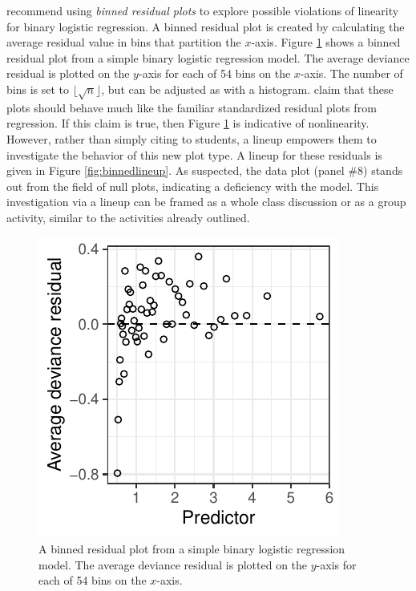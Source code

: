 \documentclass[12pt]{article}
\begin{document}
\citet{GelmanHill:2007} recommend using \emph{binned residual plots} to
explore possible violations of linearity for binary logistic regression.
A binned residual plot is created by calculating the average residual
value in bins that partition the \(x\)-axis. Figure \ref{fig:binned}
shows a binned residual plot from a simple binary logistic regression
model. The average deviance residual is plotted on the \(y\)-axis for
each of 54 bins on the \(x\)-axis. The number of bins is set to
\(\lfloor \sqrt{n} \rfloor\), but can be adjusted as with a histogram.
\citet{GelmanHill:2007} claim that these plots should behave much like
the familiar standardized residual plots from regression. If this claim
is true, then Figure \ref{fig:binned} is indicative of nonlinearity.
However, rather than simply citing \citet{GelmanHill:2007} to students,
a lineup empowers them to investigate the behavior of this new plot
type. A lineup for these residuals is given in Figure
\ref{fig:binnedlineup}. As suspected, the data plot (panel \#8) stands
out from the field of null plots, indicating a deficiency with the
model. This investigation via a lineup can be framed as a whole class
discussion or as a group activity, similar to the activities already
outlined.

\begin{figure}
\centering
\includegraphics{figs/binned_resid_example.pdf}
\caption{\label{fig:binned} A binned residual plot from a simple binary
logistic regression model. The average deviance residual is plotted on
the \(y\)-axis for each of 54 bins on the \(x\)-axis.}
\end{figure}
\end{document}
